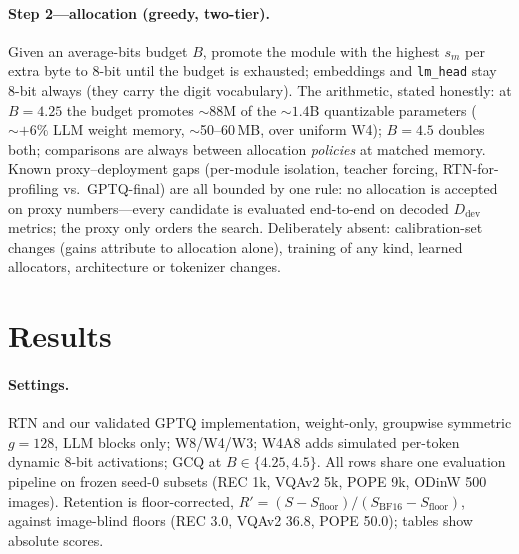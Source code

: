 \documentclass{article}
\begin{document}
\paragraph{Step 2---allocation (greedy, two-tier).} Given an average-bits budget $B$, promote the module with the highest $s_m$ per extra byte to 8-bit until the budget is exhausted; embeddings and \texttt{lm\_head} stay 8-bit always (they carry the digit vocabulary). The arithmetic, stated honestly: at $B{=}4.25$ the budget promotes ${\sim}88$M of the ${\sim}1.4$B quantizable parameters (${\sim}{+}6\%$ LLM weight memory, ${\sim}$50--60\,MB, over uniform W4); $B{=}4.5$ doubles both; comparisons are always between allocation \emph{policies} at matched memory. Known proxy--deployment gaps (per-module isolation, teacher forcing, RTN-for-profiling vs.\ GPTQ-final) are all bounded by one rule: no allocation is accepted on proxy numbers---every candidate is evaluated end-to-end on decoded $D_{\text{dev}}$ metrics; the proxy only orders the search. Deliberately absent: calibration-set changes (gains attribute to allocation alone), training of any kind, learned allocators, architecture or tokenizer changes.

\section{Results}
\label{sec:results}

\paragraph{Settings.} RTN and our validated GPTQ implementation, weight-only, groupwise symmetric $g{=}128$, LLM blocks only; W8/W4/W3; W4A8 adds simulated per-token dynamic 8-bit activations; GCQ at $B \in \{4.25, 4.5\}$. All rows share one evaluation pipeline on frozen seed-0 subsets (REC 1k, VQAv2 5k, POPE 9k, ODinW 500 images). Retention is floor-corrected, $R' = (S - S_{\text{floor}})/(S_{\text{BF16}} - S_{\text{floor}})$, against image-blind floors (REC 3.0, VQAv2 36.8, POPE 50.0); tables show absolute scores.
\end{document}
